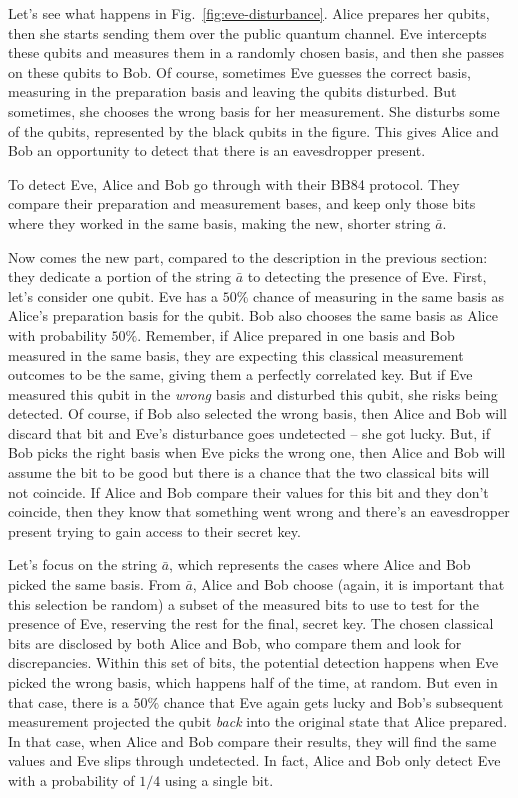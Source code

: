 Let's see what happens in Fig.~\ref{fig:eve-disturbance}. Alice prepares her qubits, then she starts sending them over the public quantum channel. Eve intercepts these qubits and measures them in a randomly chosen basis, and then she passes on these qubits to Bob. Of course, sometimes Eve guesses the correct basis, measuring in the preparation basis and leaving the qubits disturbed. But sometimes, she chooses the wrong basis for her measurement. She disturbs some of the qubits, represented by the black qubits in the figure. This gives Alice and Bob an opportunity to detect that there is an eavesdropper present.

To detect Eve, Alice and Bob go through with their BB84 protocol. They compare their preparation and measurement bases, and keep only those bits where they worked in the same basis, making the new, shorter string $\bar{a}$.

Now comes the new part, compared to the description in the previous section: they dedicate a portion of the string $\bar{a}$ to detecting the presence of Eve.  First, let's consider one qubit. Eve has a $50\%$ chance of measuring in the same basis as Alice's preparation basis for the qubit. Bob also chooses the same basis as Alice with probability $50\%$. Remember, if Alice prepared in one basis and Bob measured in the same basis, they are expecting this classical measurement outcomes to be the same, giving them a perfectly correlated key. But if Eve measured this qubit in the \emph{wrong} basis and disturbed this qubit, she risks being detected.  Of course, if Bob also selected the wrong basis, then Alice and Bob will discard that bit and Eve's disturbance goes undetected -- she got lucky.  But, if Bob picks the right basis when Eve picks the wrong one, then Alice and Bob will assume the bit to be good but there is a chance that the two classical bits will not coincide. If Alice and Bob compare their values for this bit and they don't coincide, then they know that something went wrong and there's an eavesdropper present trying to gain access to their secret key.  

Let's focus on the string $\bar{a}$, which represents the cases where Alice and Bob picked the same basis.
From $\bar{a}$, Alice and Bob choose (again, it is important that this selection be random) a subset of the measured bits to use to test for the presence of Eve, reserving the rest for the final, secret key.  The chosen classical bits are disclosed by both Alice and Bob, who compare them and look for discrepancies.  Within this set of bits, the potential detection happens when Eve picked the wrong basis, which happens half of the time, at random.  But even in that case, there is a $50\%$ chance that Eve again gets lucky and Bob's subsequent measurement projected the qubit \emph{back} into the original state that Alice prepared.  In that case, when Alice and Bob compare their results, they will find the same values and Eve slips through undetected.  In fact, Alice and Bob only detect Eve with a probability of $1/4$ using a single bit.

